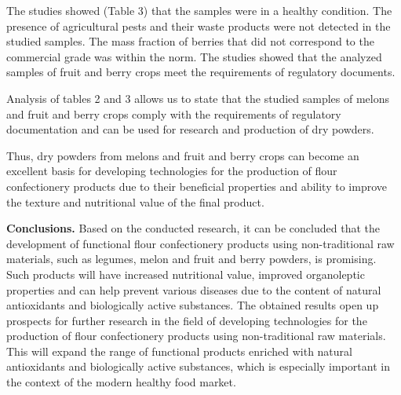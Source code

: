 
The studies showed (Table 3) that the samples were in a healthy
condition. The presence of agricultural pests and their waste products
were not detected in the studied samples. The mass fraction of berries
that did not correspond to the commercial grade was within the norm. The
studies showed that the analyzed samples of fruit and berry crops meet
the requirements of regulatory documents.

Analysis of tables 2 and 3 allows us to state that the studied samples
of melons and fruit and berry crops comply with the requirements of
regulatory documentation and can be used for research and production of
dry powders.

Thus, dry powders from melons and fruit and berry crops can become an
excellent basis for developing technologies for the production of flour
confectionery products due to their beneficial properties and ability to
improve the texture and nutritional value of the final product.

{\bfseries Conclusions.} Based on the conducted research, it can be
concluded that the development of functional flour confectionery
products using non-traditional raw materials, such as legumes, melon and
fruit and berry powders, is promising. Such products will have increased
nutritional value, improved organoleptic properties and can help prevent
various diseases due to the content of natural antioxidants and
biologically active substances. The obtained results open up prospects
for further research in the field of developing technologies for the
production of flour confectionery products using non-traditional raw
materials. This will expand the range of functional products enriched
with natural antioxidants and biologically active substances, which is
especially important in the context of the modern healthy food market.

